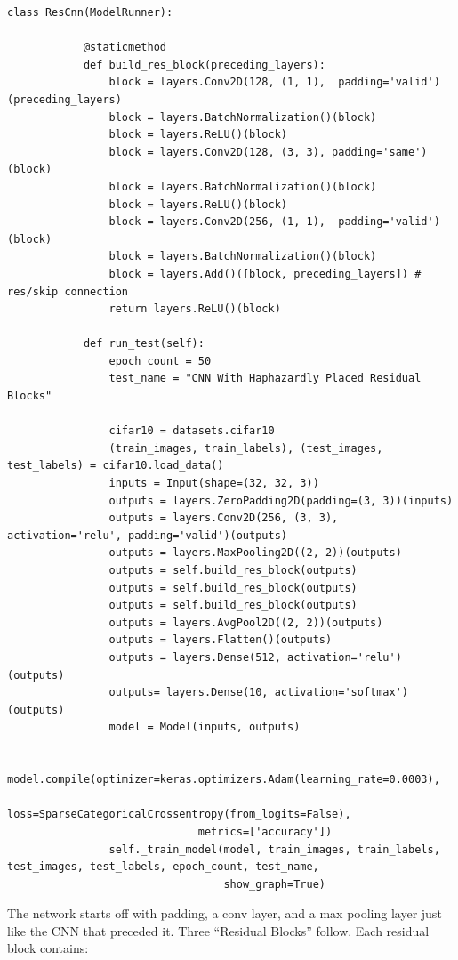 \documentclass{article}
\begin{document}
    \begin{lstlisting}[label={lst:bigger}]
        class ResCnn(ModelRunner):

            @staticmethod
            def build_res_block(preceding_layers):
                block = layers.Conv2D(128, (1, 1),  padding='valid')(preceding_layers)
                block = layers.BatchNormalization()(block)
                block = layers.ReLU()(block)
                block = layers.Conv2D(128, (3, 3), padding='same')(block)
                block = layers.BatchNormalization()(block)
                block = layers.ReLU()(block)
                block = layers.Conv2D(256, (1, 1),  padding='valid')(block)
                block = layers.BatchNormalization()(block)
                block = layers.Add()([block, preceding_layers]) # res/skip connection
                return layers.ReLU()(block)

            def run_test(self):
                epoch_count = 50
                test_name = "CNN With Haphazardly Placed Residual Blocks"

                cifar10 = datasets.cifar10
                (train_images, train_labels), (test_images, test_labels) = cifar10.load_data()
                inputs = Input(shape=(32, 32, 3))
                outputs = layers.ZeroPadding2D(padding=(3, 3))(inputs)
                outputs = layers.Conv2D(256, (3, 3), activation='relu', padding='valid')(outputs)
                outputs = layers.MaxPooling2D((2, 2))(outputs)
                outputs = self.build_res_block(outputs)
                outputs = self.build_res_block(outputs)
                outputs = self.build_res_block(outputs)
                outputs = layers.AvgPool2D((2, 2))(outputs)
                outputs = layers.Flatten()(outputs)
                outputs = layers.Dense(512, activation='relu')(outputs)
                outputs= layers.Dense(10, activation='softmax')(outputs)
                model = Model(inputs, outputs)

                model.compile(optimizer=keras.optimizers.Adam(learning_rate=0.0003),
                              loss=SparseCategoricalCrossentropy(from_logits=False),
                              metrics=['accuracy'])
                self._train_model(model, train_images, train_labels, test_images, test_labels, epoch_count, test_name,
                                  show_graph=True)
    \end{lstlisting}

    The network starts off with padding, a conv layer, and a max pooling layer just like the CNN that preceded it.
    Three ``Residual Blocks'' follow.
    Each residual block contains:
\end{document}
